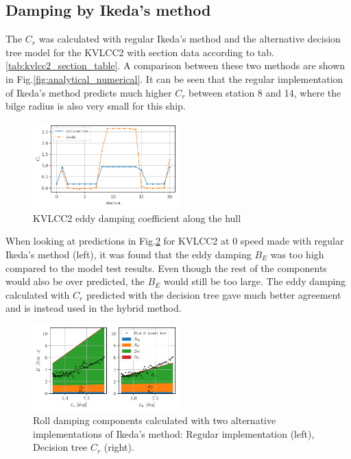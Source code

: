     \subsection*{Damping by Ikeda's method}\label{damping-by-ikedas-method}

    The $C_r$ was calculated with regular Ikeda's method and the
alternative decision tree model for the KVLCC2 with section data
according to tab.\ref{tab:kvlcc2_section_table}. A comparison
between these two methods are shown in
Fig.\ref{fig:analytical_numerical}. It can be seen that the
regular implementation of Ikeda's method predicts much higher $C_r$
between station 8 and 14, where the bilge radius is also very small for
this ship.

    

    \begin{figure}[H]
        \begin{center}\includegraphics[width = 0.5\textwidth]{figures/kvlcc2_eddy.pdf}\end{center}
        \vspace{-1cm}
        \caption{KVLCC2 eddy damping coefficient along the hull}
        \label{fig:kvlcc2_eddy}
    \end{figure}
    
    When looking at predictions in Fig.\ref{fig:ikeda} for KVLCC2 at
0 speed made with regular Ikeda's method (left), it was found that the
eddy damping $B_E$ was too high compared to the model test results.
Even though the rest of the components would also be over predicted, the
$B_E$ would still be too large. The eddy damping calculated with
$C_r$ predicted with the decision tree gave much better agreement and
is instead used in the hybrid method.

    

    \begin{figure}[H]
        \begin{center}\includegraphics[width = 0.5\textwidth]{figures/ikeda.pdf}\end{center}
        \vspace{-1cm}
        \caption{Roll damping components calculated with two alternative implementations of Ikeda's method: Regular implementation (left), Decision tree $C_r$ (right).}
        \label{fig:ikeda}
    \end{figure}
    
